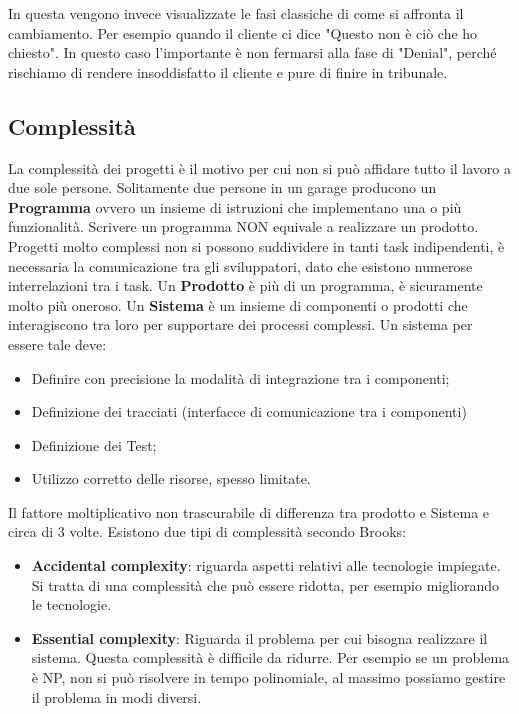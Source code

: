 \noindent In questa vengono invece visualizzate le fasi classiche di come si affronta il cambiamento. Per esempio quando il cliente ci dice "Questo non è ciò che ho chiesto".
\noindent In questo caso l'importante è non fermarsi alla fase di "Denial", perché rischiamo di rendere insoddisfatto il cliente e pure di finire in tribunale.
\subsection{Complessità}
La complessità dei progetti è il motivo per cui non si può affidare tutto il lavoro a due sole persone. Solitamente due persone in un garage producono un \textbf{Programma} ovvero un insieme di istruzioni che implementano una o più funzionalità. Scrivere un programma NON equivale a realizzare un prodotto. Progetti molto complessi non si possono suddividere in tanti task indipendenti, è necessaria la comunicazione tra gli sviluppatori, dato che esistono numerose interrelazioni tra i task.\newline
Un \textbf{Prodotto} è più di un programma, è sicuramente molto più oneroso.
Un \textbf{Sistema} è un insieme di componenti o prodotti che interagiscono tra loro per supportare dei processi complessi. Un sistema per essere tale deve:
\begin{itemize}
	\item Definire con precisione la modalità di integrazione tra i componenti;
	\item Definizione dei tracciati (interfacce di comunicazione tra i componenti)
	\item Definizione dei Test;
	\item Utilizzo corretto delle risorse, spesso limitate.
\end{itemize}
Il fattore moltiplicativo non trascurabile di differenza tra prodotto e Sistema e circa di 3 volte.\newline
Esistono due tipi di complessità secondo Brooks:
\begin{itemize}
	\item \textbf{Accidental complexity}: riguarda aspetti relativi alle tecnologie impiegate. Si tratta di una complessità che può essere ridotta, per esempio migliorando le tecnologie.
	\item \textbf{Essential complexity}: Riguarda il problema per cui bisogna realizzare il sistema. Questa complessità è difficile da ridurre. Per esempio se un problema è NP, non si può risolvere in tempo polinomiale, al massimo possiamo gestire il problema in modi diversi.
\end{itemize}
